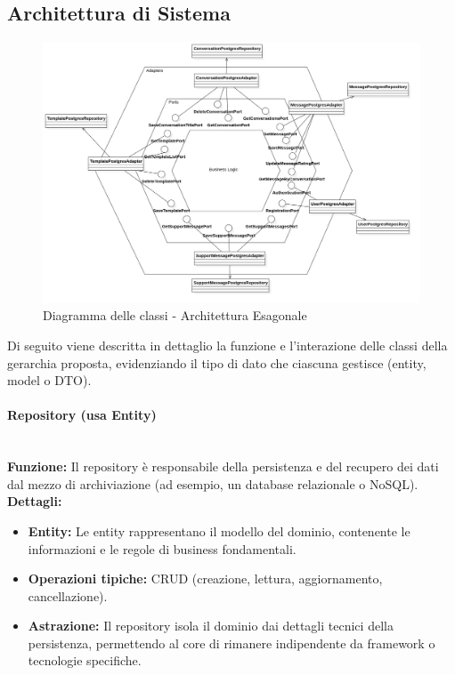\subsection{Architettura di Sistema}
\begin{figure}[H]
    \centering
    \includegraphics[width=\linewidth, height=0.8\textheight, keepaspectratio]{./img/png/Model8!ArchitetturaEsagonale_8.png}
    \caption{Diagramma delle classi - Architettura Esagonale}
    \label{fig:architettura_esagonale}
\end{figure}
Di seguito viene descritta in dettaglio la funzione e l'interazione delle classi della gerarchia proposta, evidenziando il tipo di dato che ciascuna gestisce (entity, model o DTO).

\paragraph{Repository (usa Entity)} 
\mbox{}\\
\textbf{Funzione:} Il repository è responsabile della persistenza e del recupero dei dati dal mezzo di archiviazione (ad esempio, un database relazionale o NoSQL). 
\mbox{}\\
\textbf{Dettagli:}
\begin{itemize}
  \item \textbf{Entity:} Le entity rappresentano il modello del dominio, contenente le informazioni e le regole di business fondamentali.
  \item \textbf{Operazioni tipiche:} CRUD (creazione, lettura, aggiornamento, cancellazione).
  \item \textbf{Astrazione:} Il repository isola il dominio dai dettagli tecnici della persistenza, permettendo al core di rimanere indipendente da framework o tecnologie specifiche.
\end{itemize}

